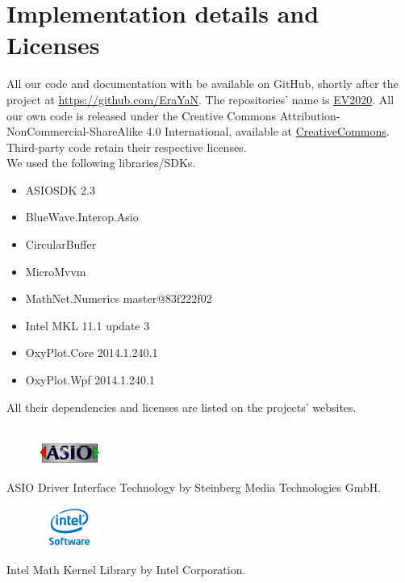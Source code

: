 \documentclass[final]{scrreprt} %
\begin{document}
\section{Implementation details and Licenses}
All our code and documentation with be available on GitHub, shortly after the project at \href{https://github.com/EraYaN}{https://github.com/EraYaN}. The repositories' name is \href{https://github.com/EraYaN/EV2020}{EV2020}. All our own code is released under the Creative Commons Attribution-NonCommercial-ShareAlike 4.0 International, available at \href{http://creativecommons.org/licenses/by-nc-sa/4.0/}{CreativeCommons}.
Third-party code retain their respective licenses.\\

We used the following libraries/SDKs.
\begin{itemize}
\item ASIOSDK 2.3
\item BlueWave.Interop.Asio
\item CircularBuffer
\item MicroMvvm
\item MathNet.Numerics master@83f222f02
\item Intel MKL 11.1 update 3
\item OxyPlot.Core 2014.1.240.1
\item OxyPlot.Wpf 2014.1.240.1
\end{itemize}
All their dependencies and licenses are listed on the projects' websites.
\\ \\
\begin{figure}[h]
	\includegraphics[width=2cm]{resources/ASIO_LOGO1.jpg}
\end{figure}
ASIO Driver Interface Technology by Steinberg Media Technologies GmbH.\\
\begin{figure}[h]
	\includegraphics[width=2cm]{resources/intel-logo.jpg}
\end{figure}
Intel Math Kernel Library by Intel Corporation.
\end{document}
